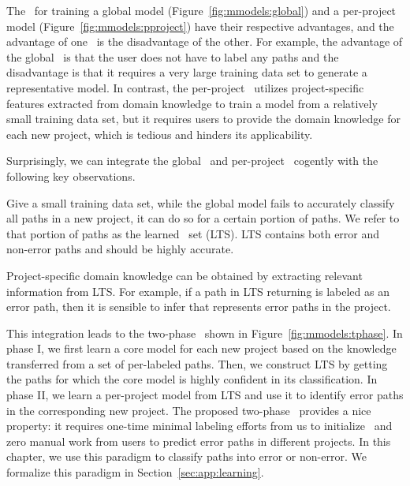 \documentclass[12pt]{report}	%
\begin{document}
%
The \paradigms\ for training a global model (Figure~\ref{fig:mmodels:global}) 
and a per-project model (Figure~\ref{fig:mmodels:pproject}) have their respective advantages, 
and the advantage of one \paradigm\ is the disadvantage of the other. 
%
For example, the advantage of the global \paradigm\ is that the user does not have to 
label any paths and the disadvantage is that it requires a very large training data set
to generate a representative model.
%
In contrast, the per-project \paradigm\ utilizes project-specific features extracted from domain knowledge
to train a model from a relatively small training data set,
but it requires users to provide the domain knowledge for each new project,
which is tedious and hinders its applicability.

Surprisingly, we can integrate the global \paradigm\ and per-project \paradigm\
cogently with the following key observations. 
%
\begin{enumerate*}[label={(\arabic*)}]
%
\item Give a small training data set, 
while the global model fails to accurately classify all paths in a new project,
it can do so for a certain portion of paths.
We refer to that portion of paths as the learned \typical\ set (LTS).
LTS contains both error and non-error paths and should be
highly accurate. 


\item Project-specific domain knowledge can be 
obtained by extracting relevant information from LTS.
For example, if a path in LTS returning  is labeled as an error path,
then it is sensible to infer that \prog{EINVAL} represents error paths in the project.

\end{enumerate*}

This integration leads to the two-phase \paradigm\ shown in Figure~\ref{fig:mmodels:tphase}. 
In phase I, we first learn a core model for each new project 
based on the knowledge transferred from a set of per-labeled paths.
Then, we construct LTS by getting the paths for which the core model is highly confident in its classification.
%
In phase II, we learn a per-project model from LTS
and use it to identify error paths in the corresponding new project.
The proposed two-phase \paradigm\ provides a nice property:
it requires one-time minimal labeling efforts from us
to initialize \newTool\
and zero manual work from users
to predict error paths in different projects.
%
In this chapter, we use this paradigm to classify paths into error
or non-error. We formalize this paradigm in Section~\ref{sec:app:learning}.
\end{document}
